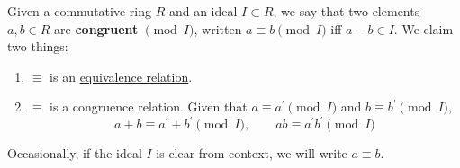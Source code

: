   \begin{theorem}
    \label{thm:equivalence-relation-induced-by-an-ideal}
    Given a commutative ring $R$ and an ideal $I \subset R$, we say that two elements $a, b \in R$ are \textbf{congruent} $\pmod{I}$, written $a \equiv b \pmod{I}$ iff $a - b \in I$. We claim two things: 
    \begin{enumerate}
      \item $\equiv$ is an \hyperref[st-def:equivalence_relation]{equivalence relation}. 
      \item $\equiv$ is a congruence relation. Given that $a \equiv a^\prime \pmod{I}$ and $b \equiv b^\prime \pmod{I}$, 
      \begin{equation}
        a + b \equiv a^\prime + b^\prime \pmod{I}, \qquad ab \equiv a^\prime b^\prime \pmod{I}
      \end{equation}
    \end{enumerate}
    Occasionally, if the ideal $I$ is clear from context, we will write $a \equiv b$. 
  \end{theorem}
